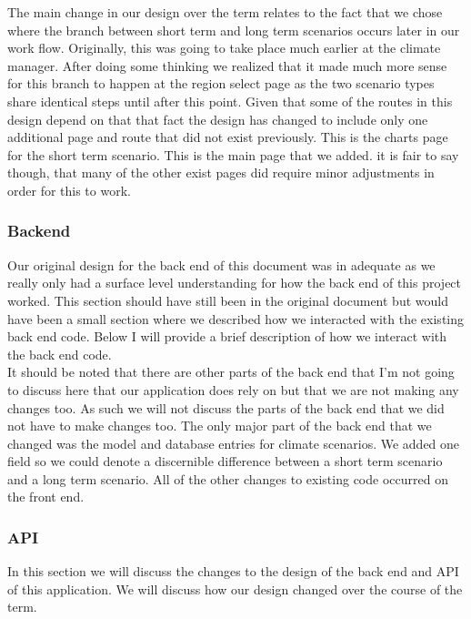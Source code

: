 \documentclass[onecolumn, draftclsnofoot,10pt, compsoc]{article}
\begin{document}
        The main change in our design over the term relates to the fact that we chose where the branch between short term and long term scenarios occurs later in our work flow. Originally, this was going to take place much earlier at the climate manager. After doing some thinking we realized that it made much more sense for this branch to happen at the region select page as the two scenario types share identical steps until after this point. Given that some of the routes in this design depend on that that fact the design has changed to include only one additional page and route that did not exist previously. This is the charts page for the short term scenario. This is the main page that we added. it is fair to say though, that many of the other exist pages did require minor adjustments in order for this to work.\\
        
        \subsubsection{Backend}
        Our original design for the back end of this document was in adequate as we really only had a surface level understanding for how the back end of this project worked. This section should have still been in the original document but would have been a small section where we described how we interacted with the existing back end code. Below I will provide a brief description of how we interact with the back end code.\\
        
        It should be noted that there are other parts of the back end that I'm not going to discuss here that our application does rely on but that we are not making any changes too. As such we will not discuss the parts of the back end that we did not have to make changes too. The only major part of the back end that we changed was the model and database entries for climate scenarios. We added one field so we could denote a discernible difference between a short term scenario and a long term scenario. All of the other changes to existing code occurred on the front end.\\
        
        \subsubsection{API}
        In this section we will discuss the changes to the design of the back end and API of this application. We will discuss how our design changed over the course of the term.
        
\end{document}
